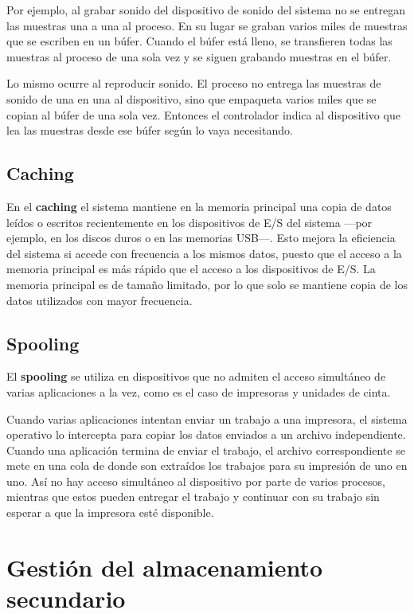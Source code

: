 Por ejemplo, al grabar sonido del dispositivo de sonido del sistema no
se entregan las muestras una a una al proceso. En su lugar se graban
varios miles de muestras que se escriben en un búfer. Cuando el búfer
está lleno, se transfieren todas las muestras al proceso de una sola vez
y se siguen grabando muestras en el búfer.

Lo mismo ocurre al reproducir sonido. El proceso no entrega las muestras
de sonido de una en una al dispositivo, sino que empaqueta varios miles
que se copian al búfer de una sola vez. Entonces el controlador indica
al dispositivo que lea las muestras desde ese búfer según lo vaya
necesitando.

\subsection{\texorpdfstring{{}Caching}{Caching}}\label{_cachingcaching}

En el \textbf{caching} el sistema mantiene en la memoria principal una
copia de datos leídos o escritos recientemente en los dispositivos de
E/S del sistema ---por ejemplo, en los discos duros o en las memorias
USB---. Esto mejora la eficiencia del sistema si accede con frecuencia a
los mismos datos, puesto que el acceso a la memoria principal es más
rápido que el acceso a los dispositivos de E/S. La memoria principal es
de tamaño limitado, por lo que solo se mantiene copia de los datos
utilizados con mayor frecuencia.

\subsection{\texorpdfstring{{}Spooling}{Spooling}}\label{_spoolingspooling}

El \textbf{spooling} se utiliza en dispositivos que no admiten el acceso
simultáneo de varias aplicaciones a la vez, como es el caso de
impresoras y unidades de cinta.

Cuando varias aplicaciones intentan enviar un trabajo a una impresora,
el sistema operativo lo intercepta para copiar los datos enviados a un
archivo independiente. Cuando una aplicación termina de enviar el
trabajo, el archivo correspondiente se mete en una cola de donde son
extraídos los trabajos para su impresión de uno en uno. Así no hay
acceso simultáneo al dispositivo por parte de varios procesos, mientras
que estos pueden entregar el trabajo y continuar con su trabajo sin
esperar a que la impresora esté disponible.

\section{Gestión del almacenamiento
secundario}\label{_gestiuxf3n_del_almacenamiento_secundario}

